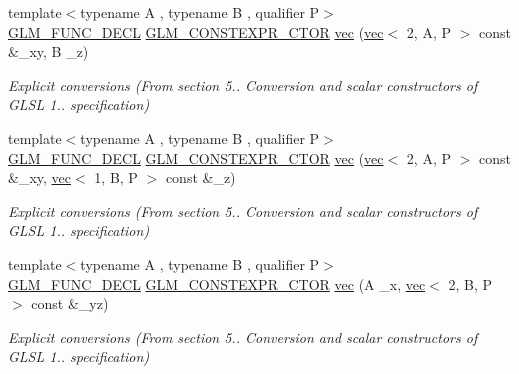 \begin{DoxyCompactItemize}
\item 
{\footnotesize template$<$typename A , typename B , qualifier P$>$ }\\\hyperlink{setup_8hpp_ab2d052de21a70539923e9bcbf6e83a51}{G\+L\+M\+\_\+\+F\+U\+N\+C\+\_\+\+D\+E\+CL} \hyperlink{setup_8hpp_ad34178a09666081abdb573c14d1f4a5a}{G\+L\+M\+\_\+\+C\+O\+N\+S\+T\+E\+X\+P\+R\+\_\+\+C\+T\+OR} \hyperlink{structglm_1_1vec_3_013_00_01_t_00_01_q_01_4_a7c657ca44f6029476baa5ad38c8e6220}{vec} (\hyperlink{structglm_1_1vec}{vec}$<$ 2, A, P $>$ const \&\+\_\+xy, B \+\_\+z)
\begin{DoxyCompactList}\small\item\em Explicit conversions (From section 5.. Conversion and scalar constructors of G\+L\+SL 1.. specification) \end{DoxyCompactList}\item 
{\footnotesize template$<$typename A , typename B , qualifier P$>$ }\\\hyperlink{setup_8hpp_ab2d052de21a70539923e9bcbf6e83a51}{G\+L\+M\+\_\+\+F\+U\+N\+C\+\_\+\+D\+E\+CL} \hyperlink{setup_8hpp_ad34178a09666081abdb573c14d1f4a5a}{G\+L\+M\+\_\+\+C\+O\+N\+S\+T\+E\+X\+P\+R\+\_\+\+C\+T\+OR} \hyperlink{structglm_1_1vec_3_013_00_01_t_00_01_q_01_4_a800af9ada84dfb76714e279e81eb266e}{vec} (\hyperlink{structglm_1_1vec}{vec}$<$ 2, A, P $>$ const \&\+\_\+xy, \hyperlink{structglm_1_1vec}{vec}$<$ 1, B, P $>$ const \&\+\_\+z)
\begin{DoxyCompactList}\small\item\em Explicit conversions (From section 5.. Conversion and scalar constructors of G\+L\+SL 1.. specification) \end{DoxyCompactList}\item 
{\footnotesize template$<$typename A , typename B , qualifier P$>$ }\\\hyperlink{setup_8hpp_ab2d052de21a70539923e9bcbf6e83a51}{G\+L\+M\+\_\+\+F\+U\+N\+C\+\_\+\+D\+E\+CL} \hyperlink{setup_8hpp_ad34178a09666081abdb573c14d1f4a5a}{G\+L\+M\+\_\+\+C\+O\+N\+S\+T\+E\+X\+P\+R\+\_\+\+C\+T\+OR} \hyperlink{structglm_1_1vec_3_013_00_01_t_00_01_q_01_4_a06a314f757e08eddfb46a1c759cf5c8e}{vec} (A \+\_\+x, \hyperlink{structglm_1_1vec}{vec}$<$ 2, B, P $>$ const \&\+\_\+yz)
\begin{DoxyCompactList}\small\item\em Explicit conversions (From section 5.. Conversion and scalar constructors of G\+L\+SL 1.. specification) \end{DoxyCompactList}\item 

\end{DoxyCompactItemize}
